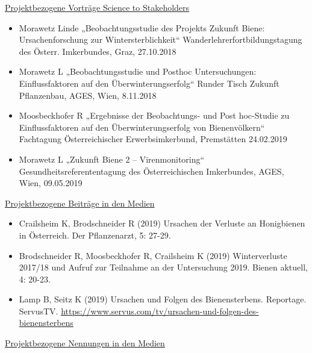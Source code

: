 \underline{Projektbezogene Vorträge Science to Stakeholders}

\begin{itemize}
    \item 
    Morawetz Linde „Beobachtungsstudie des Projekts Zukunft Biene: Ursachenforschung zur Wintersterblichkeit“ Wanderlehrerfortbildungstagung des Österr. Imkerbundes, Graz, 27.10.2018

    \item 
    Morawetz L „Beobachtungsstudie und Posthoc Untersuchungen: Einflussfaktoren auf den Überwinterungserfolg“ Runder Tisch Zukunft Pflanzenbau, AGES, Wien, 8.11.2018

    \item 
    Moosbeckhofer R „Ergebnisse der Beobachtungs- und Post hoc-Studie zu Einflussfaktoren auf den Überwinterungserfolg von Bienenvölkern“ Fachtagung Österreichischer Erwerbsimkerbund, Premstätten 24.02.2019

    \item 
    Morawetz L „Zukunft Biene 2 – Virenmonitoring“ Gesundheitsreferententagung des Österreichischen Imkerbundes, AGES, Wien, 09.05.2019

\end{itemize}

\underline{Projektbezogene Beiträge in den Medien}

\begin{itemize}

    \item
    Crailsheim K, Brodschneider R (2019) Ursachen der Verluste an Honigbienen in Österreich. Der Pflanzenarzt, 5: 27-29.

    \item
    Brodschneider R, Moosbeckhofer R, Crailsheim K (2019) Winterverluste 2017/18 und Aufruf zur Teilnahme an der Untersuchung 2019. Bienen aktuell, 4: 20-23.

    \item
    Lamp B, Seitz K (2019) Ursachen und Folgen des Bienensterbens. Reportage. ServusTV. \url{https://www.servus.com/tv/ursachen-und-folgen-des-bienensterbens}

\end{itemize}

\underline{Projektbezogene Nennungen in den Medien}

